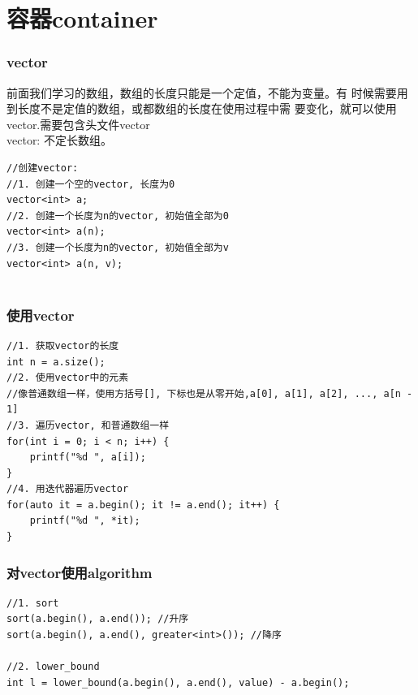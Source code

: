 \documentclass{beamer}
\begin{document}


    


\section{容器container}

\begin{frame}[fragile]
    \frametitle{vector}
    前面我们学习的数组，数组的长度只能是一个定值，不能为变量。有
    时候需要用到长度不是定值的数组，或都数组的长度在使用过程中需
    要变化，就可以使用vector.需要包含头文件vector\\
    vector: 不定长数组。\\
    \begin{lstlisting}
//创建vector:
//1. 创建一个空的vector, 长度为0
vector<int> a;
//2. 创建一个长度为n的vector, 初始值全部为0
vector<int> a(n);
//3. 创建一个长度为n的vector, 初始值全部为v
vector<int> a(n, v);


    \end{lstlisting}

\end{frame}


\begin{frame}[fragile]
    \frametitle{使用vector}
    \begin{lstlisting}
//1. 获取vector的长度
int n = a.size();
//2. 使用vector中的元素
//像普通数组一样，使用方括号[], 下标也是从零开始,a[0], a[1], a[2], ..., a[n - 1]
//3. 遍历vector, 和普通数组一样
for(int i = 0; i < n; i++) {
    printf("%d ", a[i]);
}
//4. 用迭代器遍历vector
for(auto it = a.begin(); it != a.end(); it++) {
    printf("%d ", *it);
}

    \end{lstlisting}

\end{frame}

\begin{frame}[fragile]
    \frametitle{对vector使用algorithm}
    \begin{lstlisting}
//1. sort
sort(a.begin(), a.end()); //升序
sort(a.begin(), a.end(), greater<int>()); //降序

//2. lower_bound
int l = lower_bound(a.begin(), a.end(), value) - a.begin();

    \end{lstlisting}

\end{frame}
\end{document}
